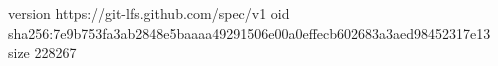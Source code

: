 version https://git-lfs.github.com/spec/v1
oid sha256:7e9b753fa3ab2848e5baaaa49291506e00a0effecb602683a3aed98452317e13
size 228267
